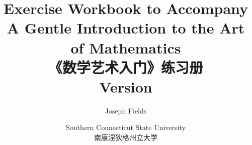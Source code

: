 \documentclass[12pt,twoside]{book}
\begin{document}
\frontmatter

\title{Exercise Workbook to Accompany \\
A Gentle Introduction to the Art of Mathematics\\ 《数学艺术入门》练习册 \\{\small Version \versionNum
{} }}
\author{Joseph Fields}
\date{Southern Connecticut State University \\ 南康涅狄格州立大学}

\maketitle

\clearpage



\clearpage

\mainmatter










\end{document}
